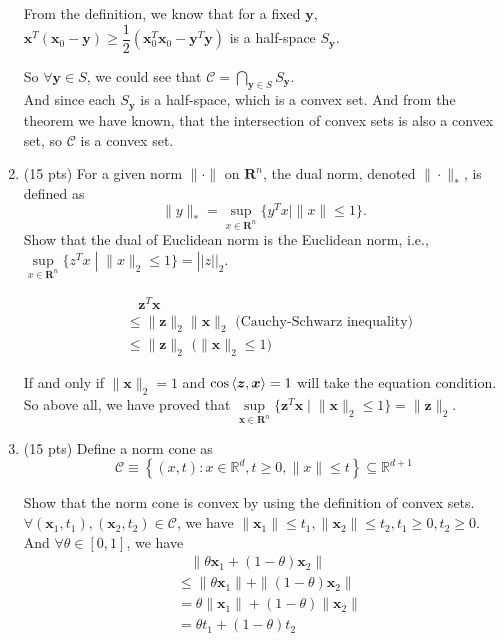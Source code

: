 \documentclass[10pt]{article}
\renewcommand{\mathbf}{\boldsymbol}
\begin{document}
\begin{enumerate}
From the definition, we know that for a fixed $\mathbf{y}$, 
$\mathbf{x}^T(\mathbf{x}_0-\mathbf{y}) \geq \dfrac{1}{2}(\mathbf{x}_0^T\mathbf{x}_0-\mathbf{y}^T\mathbf{y})$ is a half-space $S_{\mathbf{y}}$.

So $\forall\mathbf{y}\in S$, we could see that $\mathcal{C}=\bigcap\limits_{\mathbf{y}\in S}S_{\mathbf{y}}$.\\
And since each $S_{\mathbf{y}}$ is a half-space, which is a convex set. And from the theorem we have known, that 
the intersection of convex sets is also a convex set, so $\mathcal{C}$ is a convex set.


\newpage

\item {\color{red} (15 pts)} For a given norm $\|\cdot\|$ on $\mathbf{R}^n$, the dual norm, denoted $\|\cdot\|_*$, is defined as
$$
\|y\|_*=\sup_{x\in\mathbf{R}^n} \{y^T x\mid\|x\|\leq1\}.
$$ 
Show that the dual of Euclidean norm is the Euclidean norm, i.e., $\sup\limits_{x \in \mathbf{R}^n}\{z^{T}x \;| \;\|x\|_2\leq1\}=||z||_{2}$.

\begin{align*}
    &\ \ \ \ \mathbf{z}^T\mathbf{x}\\
    &\leq \|\mathbf{z}\|_2\|\mathbf{x}\|_2   \text{\ \ \ \ (Cauchy-Schwarz inequality)}\\  
    &\leq \|\mathbf{z}\|_2                   \text{\ \ \ \ \ \ \ \ \ \ \ ($\|\mathbf{x}\|_2\leq 1$)}
\end{align*}

If and only if $\|\mathbf{x}\|_2=1$ and $\cos\Braket{\mathbf{z},\mathbf{x}}=1$ will take the equation condition.\\
So above all, we have proved that $\sup\limits_{\mathbf{x} \in \mathbf{R}^n}\{\mathbf{z}^{T}\mathbf{x} \;| \;\|\mathbf{x}\|_2\leq1\}=\|\mathbf{z}\|_{2}$.

\newpage

\item {\color{red} (15 pts)} Define a norm cone as
$$
\mathcal{C} \equiv \left\{(x, t): x \in \mathbb{R}^d, t \geq 0,\|x\| \leq t\right\} \subseteq \mathbb{R}^{d+1}
$$

Show that the norm cone is convex by using the definition of convex sets.\\

$\forall (\mathbf{x}_1,t_1),(\mathbf{x}_2,t_2)\in \mathcal{C}$, we have $\|\mathbf{x}_1\|\leq t_1, \|\mathbf{x}_2\|\leq t_2, t_1\geq 0,t_2\geq 0$.\\
And $\forall\theta\in [0,1]$, we have
\begin{align*}
    &\ \ \ \ \|\theta \mathbf{x}_1+(1-\theta)\mathbf{x}_2\|\\
    &\leq \|\theta \mathbf{x}_1\|+\|(1-\theta)\mathbf{x}_2\|\\
    &= \theta\|\mathbf{x}_1\|+(1-\theta)\|\mathbf{x}_2\|\\
    &= \theta t_1+(1-\theta)t_2
\end{align*}


\end{enumerate}
\end{document}
